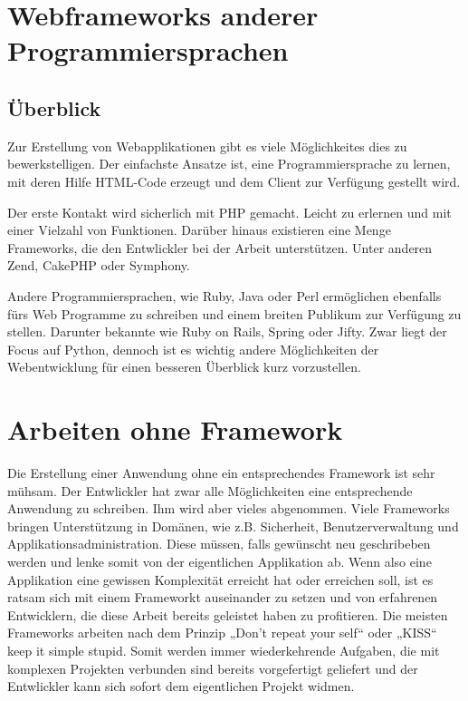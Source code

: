 \section{Webframeworks anderer Programmiersprachen }
\subsection{Überblick}
Zur Erstellung von Webapplikationen gibt es viele Möglichkeites dies zu
bewerkstelligen. Der einfachste Ansatze ist, eine Programmiersprache zu lernen,
mit deren Hilfe HTML-Code erzeugt und dem Client zur Verfügung gestellt
wird.

Der erste Kontakt wird sicherlich mit PHP gemacht. Leicht zu erlernen und
mit einer Vielzahl von Funktionen. Darüber hinaus existieren eine Menge
Frameworks, die den Entwlickler bei der Arbeit unterstützen. Unter anderen Zend,
CakePHP oder Symphony.

Andere Programmiersprachen, wie Ruby, Java oder Perl ermöglichen ebenfalls fürs
Web Programme zu schreiben und einem breiten Publikum zur Verfügung zu stellen.
Darunter bekannte wie Ruby on Rails, Spring oder Jifty. Zwar liegt der Focus
auf Python, dennoch ist es wichtig andere Möglichkeiten der Webentwicklung für
einen besseren Überblick kurz vorzustellen.


\section{Arbeiten ohne Framework}
Die Erstellung einer Anwendung ohne ein entsprechendes Framework ist sehr
mühsam. Der Entwlickler hat zwar alle Möglichkeiten eine entsprechende
Anwendung zu schreiben. Ihm wird aber vieles abgenommen. Viele Frameworks
bringen Unterstützung in Domänen, wie z.B. Sicherheit, Benutzerverwaltung und
Applikationsadministration. Diese müssen, falls gewünscht neu geschribeben
werden und lenke somit von der eigentlichen Applikation ab. Wenn also eine
Applikation eine gewissen Komplexität erreicht hat oder erreichen soll, ist es
ratsam sich mit einem Frameworkt auseinander zu setzen und von erfahrenen
Entwicklern, die diese Arbeit bereits geleistet haben zu profitieren. Die
meisten Frameworks arbeiten nach dem Prinzip „Don't repeat your self“ oder
„KISS“ keep it simple stupid. Somit werden immer wiederkehrende Aufgaben, die
mit komplexen Projekten verbunden sind bereits vorgefertigt geliefert und der
Entwlickler kann sich sofort dem eigentlichen Projekt widmen. 


